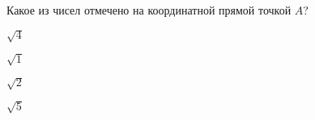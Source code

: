 \begin{ex}
	Какое из чисел отмечено на координатной прямой точкой $A$?
	
	\selectanswer
	\begin{enumcols}[columns=4]
		\item $\sqrt{4}$
		\item $\sqrt{1}$
		\item $\sqrt{2}$
		\item $\sqrt{5}$
	\end{enumcols}
\end{ex}